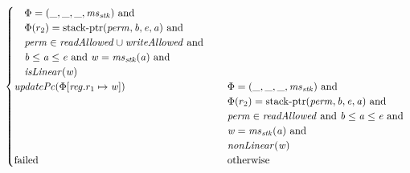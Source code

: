 \documentclass[a4paper]{article}
\newcommand{\tand}{\text{ and }}
\newcommand{\totherwise}{\text{otherwise }}
\newcommand{\update}[2]{[#1 \mapsto #2]}
\newcommand{\perm}{\var{perm}}
\newcommand{\stkptr}[1]{\mathrm{stack\text{-}ptr}(#1)}
\newcommand{\failed}{\mathrm{failed}}
\newcommand{\var}[1]{\mathit{#1}}
\newcommand{\reg}{\var{reg}}
\newcommand{\ms}{\var{ms}}
\newcommand{\stk}{\var{stk}}
\newcommand{\baddr}{\var{b}}
\newcommand{\eaddr}{\var{e}}
\newcommand{\aaddr}{\var{a}}
\newcommand{\plainfun}[2]{
  \ifthenelse{\equal{#2}{}}
  {\mathit{#1}}
  {\mathit{#1}(#2)}
}
\newcommand{\updPcAddr}[1]{\plainfun{updatePc}{#1}}
\newcommand{\readAllowed}[1]{\plainfun{readAllowed}{#1}}
\newcommand{\writeAllowed}[1]{\plainfun{writeAllowed}{#1}}
\newcommand{\nonLinear}[1]{\plainfun{nonLinear}{#1}}
\newcommand{\isLinear}[1]{\plainfun{isLinear}{#1}}
\begin{document}
\begin{align*}
\begin{cases}
                                \begin{array}[t]{l}
                                  \begin{array}[t]{l}
                                  \Phi = (\_, \_, \_, \ms_\stk) \tand \\
                                  \Phi(r_2) = \stkptr{\perm,\baddr,\eaddr,\aaddr} \tand \\
                                  \perm \in \readAllowed{} \cup \writeAllowed{} \tand \\
                                  \baddr \leq \aaddr \leq \eaddr \tand \var{w} = \ms_\stk(\aaddr) \tand \\
                                  \isLinear{\var{w}}
                                \end{array}
                                \\
                                \end{array}
                                \\
                                \updPcAddr{\Phi\update{\reg.r_1}{\var{w}}} &
                                \arraycolsep=0pt
                                \begin{array}[t]{l}
                                  \Phi = (\_, \_, \_, \ms_\stk) \tand \\
                                  \Phi(r_2) = \stkptr{\perm,\baddr,\eaddr,\aaddr} \tand \\
                                  \perm \in \readAllowed{} \tand \baddr \leq \aaddr \leq \eaddr \tand\\
                                  \var{w} = \ms_\stk(\aaddr) \tand \\
                                  \nonLinear{\var{w}}
                                \end{array}\\
                                \failed & \totherwise
                              \end{cases}
\end{align*}
\end{document}
